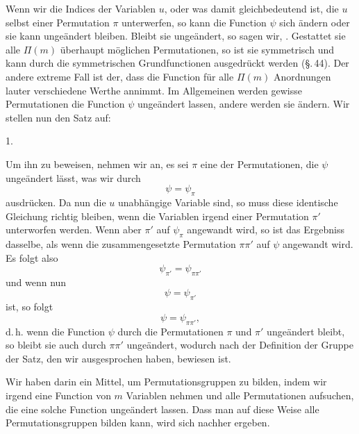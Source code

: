 Wenn wir die Indices der Variablen $u$, oder was damit gleichbedeutend ist, die $u$ selbst einer Permutation $\pi$ unterwerfen, so kann die Function $\psi$ sich ändern oder sie kann ungeändert bleiben. Bleibt sie ungeändert, so sagen wir, . Gestattet sie alle $\Pi(m)$ überhaupt möglichen Permutationen, so ist sie symmetrisch und kann durch die symmetrischen Grundfunctionen ausgedrückt werden (\S.\,44). Der andere extreme Fall ist der, dass die Function für alle $\Pi(m)$ Anordnungen lauter verschiedene Werthe annimmt. Im Allgemeinen werden gewisse Permutationen die Function $\psi$ ungeändert lassen, andere werden sie ändern. Wir stellen nun den Satz auf:

1. 

Um ihn zu beweisen, nehmen wir an, es sei $\pi$ eine der Permutationen, die $\psi$ ungeändert lässt, was wir durch
\[
\psi = \psi_\pi
\]
ausdrücken. Da nun die $u$ unabhängige Variable sind, so muss diese identische Gleichung richtig bleiben, wenn die Variablen irgend einer Permutation $\pi'$ unterworfen werden. Wenn aber $\pi'$ auf $\psi_\pi$ angewandt wird, so ist das Ergebniss dasselbe, als wenn die zusammengesetzte Permutation $\pi\pi'$ auf $\psi$ angewandt wird. Es folgt also
\[
\psi_{\pi'} = \psi_{\pi\pi'}
\]
und wenn nun
\[
\psi = \psi_{\pi'}
\]
ist, so folgt
\[
\psi = \psi_{\pi\pi'},
\]
d.\,h. wenn die Function $\psi$ durch die Permutationen $\pi$ und $\pi'$ ungeändert bleibt, so bleibt sie auch durch $\pi\pi'$ ungeändert, wodurch nach der Definition der Gruppe der Satz, den wir ausgesprochen haben, bewiesen ist.

Wir haben darin ein Mittel, um Permutationsgruppen zu bilden, indem wir irgend eine Function von $m$ Variablen nehmen und alle Permutationen aufsuchen, die eine solche Function ungeändert lassen. Dass man auf diese Weise alle Permutationsgruppen bilden kann, wird sich nachher ergeben.
